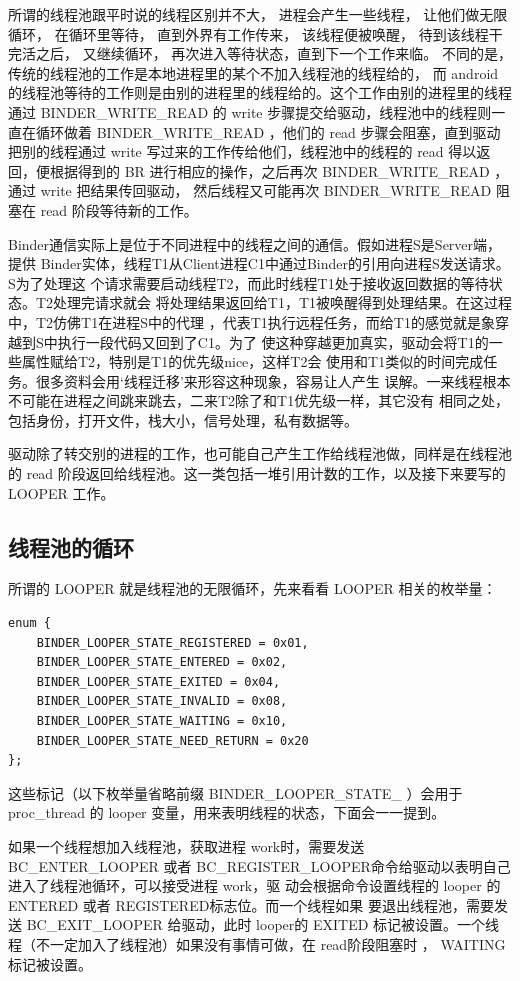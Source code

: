 \documentclass[a4paper,11pt]{article}
\begin{document}
所谓的线程池跟平时说的线程区别并不大， 进程会产生一些线程， 让他们做无限循环，
在循环里等待， 直到外界有工作传来， 该线程便被唤醒， 待到该线程干完活之后，
又继续循环， 再次进入等待状态，直到下一个工作来临。 不同的是，
传统的线程池的工作是本地进程里的某个不加入线程池的线程给的， 而 android
的线程池等待的工作则是由别的进程里的线程给的。这个工作由别的进程里的线程通过
BINDER_WRITE_READ 的 write 步骤提交给驱动，线程池中的线程则一直在循环做着
BINDER_WRITE_READ ，他们的 read 步骤会阻塞，直到驱动把别的线程通过 write
写过来的工作传给他们，线程池中的线程的 read 得以返回，便根据得到的 BR
进行相应的操作，之后再次 BINDER_WRITE_READ ，通过 write 把结果传回驱动，
然后线程又可能再次 BINDER_WRITE_READ 阻塞在 read 阶段等待新的工作。

Binder通信实际上是位于不同进程中的线程之间的通信。假如进程S是Server端，提供
Binder实体，线程T1从Client进程C1中通过Binder的引用向进程S发送请求。S为了处理这
个请求需要启动线程T2，而此时线程T1处于接收返回数据的等待状态。T2处理完请求就会
将处理结果返回给T1，T1被唤醒得到处理结果。在这过程中，T2仿佛T1在进程S中的代理
，代表T1执行远程任务，而给T1的感觉就是象穿越到S中执行一段代码又回到了C1。为了
使这种穿越更加真实，驱动会将T1的一些属性赋给T2，特别是T1的优先级nice，这样T2会
使用和T1类似的时间完成任务。很多资料会用‘线程迁移’来形容这种现象，容易让人产生
误解。一来线程根本不可能在进程之间跳来跳去，二来T2除了和T1优先级一样，其它没有
相同之处，包括身份，打开文件，栈大小，信号处理，私有数据等。

驱动除了转交别的进程的工作，也可能自己产生工作给线程池做，同样是在线程池的 read
阶段返回给线程池。这一类包括一堆引用计数的工作，以及接下来要写的 LOOPER 工作。

\subsection{线程池的循环}\label{protocol:threadpool}
所谓的 LOOPER 就是线程池的无限循环，先来看看 LOOPER 相关的枚举量：
\begin{lstlisting}[multicols=2,caption=Binder Looper state]
enum {
    BINDER_LOOPER_STATE_REGISTERED = 0x01,
    BINDER_LOOPER_STATE_ENTERED = 0x02,
    BINDER_LOOPER_STATE_EXITED = 0x04,
    BINDER_LOOPER_STATE_INVALID = 0x08,
    BINDER_LOOPER_STATE_WAITING = 0x10,
    BINDER_LOOPER_STATE_NEED_RETURN = 0x20
};
\end{lstlisting}

这些标记（以下枚举量省略前缀 BINDER_LOOPER_STATE_ ）会用于 proc_thread 的
looper 变量，用来表明线程的状态，下面会一一提到。

如果一个线程想加入线程池，获取进程 work时，需要发送 BC_ENTER_LOOPER 或者
BC_REGISTER_LOOPER命令给驱动以表明自己进入了线程池循环，可以接受进程 work，驱
动会根据命令设置线程的 looper 的 ENTERED 或者 REGISTERED标志位。而一个线程如果
要退出线程池，需要发送 BC_EXIT_LOOPER 给驱动，此时 looper的 EXITED
标记被设置。一个线程（不一定加入了线程池）如果没有事情可做，在 read阶段阻塞时
， WAITING 标记被设置。
\end{document}
